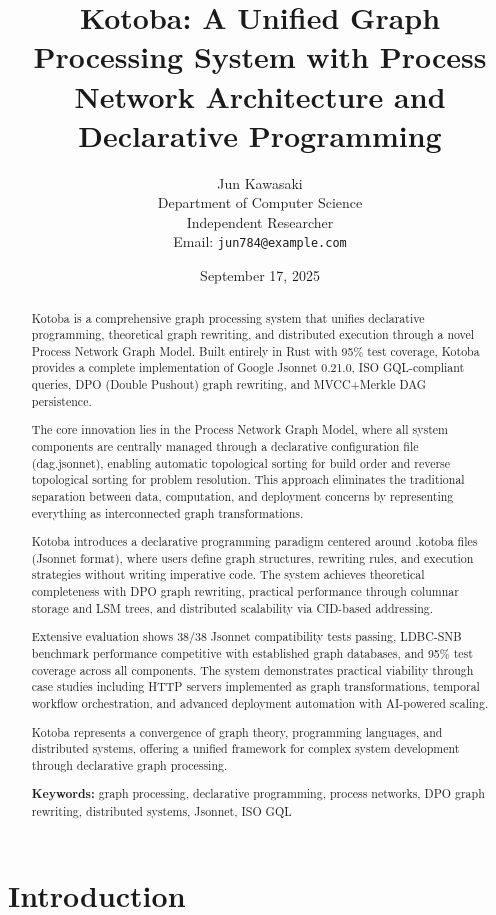 \documentclass[11pt,a4paper]{article}
\title{Kotoba: A Unified Graph Processing System with Process Network Architecture and Declarative Programming}
\author{
Jun Kawasaki \\
Department of Computer Science \\
Independent Researcher \\
Email: \texttt{jun784@example.com}
}
\date{September 17, 2025}
\begin{document}
\maketitle

\begin{abstract}
Kotoba is a comprehensive graph processing system that unifies declarative programming, theoretical graph rewriting, and distributed execution through a novel Process Network Graph Model. Built entirely in Rust with 95\% test coverage, Kotoba provides a complete implementation of Google Jsonnet 0.21.0, ISO GQL-compliant queries, DPO (Double Pushout) graph rewriting, and MVCC+Merkle DAG persistence.

The core innovation lies in the Process Network Graph Model, where all system components are centrally managed through a declarative configuration file (dag.jsonnet), enabling automatic topological sorting for build order and reverse topological sorting for problem resolution. This approach eliminates the traditional separation between data, computation, and deployment concerns by representing everything as interconnected graph transformations.

Kotoba introduces a declarative programming paradigm centered around .kotoba files (Jsonnet format), where users define graph structures, rewriting rules, and execution strategies without writing imperative code. The system achieves theoretical completeness with DPO graph rewriting, practical performance through columnar storage and LSM trees, and distributed scalability via CID-based addressing.

Extensive evaluation shows 38/38 Jsonnet compatibility tests passing, LDBC-SNB benchmark performance competitive with established graph databases, and 95\% test coverage across all components. The system demonstrates practical viability through case studies including HTTP servers implemented as graph transformations, temporal workflow orchestration, and advanced deployment automation with AI-powered scaling.

Kotoba represents a convergence of graph theory, programming languages, and distributed systems, offering a unified framework for complex system development through declarative graph processing.

\textbf{Keywords:} graph processing, declarative programming, process networks, DPO graph rewriting, distributed systems, Jsonnet, ISO GQL
\end{abstract}

\section{Introduction}
\label{sec:introduction}
\end{document}
